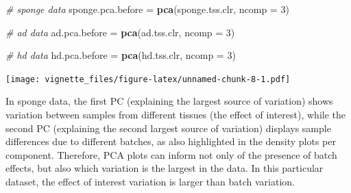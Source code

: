 \documentclass[]{book}
\newenvironment{Shaded}{\begin{snugshade}}{\end{snugshade}}
\newcommand{\KeywordTok}[1]{\textcolor[rgb]{0.13,0.29,0.53}{\textbf{#1}}}
\newcommand{\DataTypeTok}[1]{\textcolor[rgb]{0.13,0.29,0.53}{#1}}
\newcommand{\DecValTok}[1]{\textcolor[rgb]{0.00,0.00,0.81}{#1}}
\newcommand{\FloatTok}[1]{\textcolor[rgb]{0.00,0.00,0.81}{#1}}
\newcommand{\StringTok}[1]{\textcolor[rgb]{0.31,0.60,0.02}{#1}}
\newcommand{\CommentTok}[1]{\textcolor[rgb]{0.56,0.35,0.01}{\textit{#1}}}
\newcommand{\OperatorTok}[1]{\textcolor[rgb]{0.81,0.36,0.00}{\textbf{#1}}}
\newcommand{\NormalTok}[1]{#1}
\begin{document}
\begin{Shaded}
\begin{Highlighting}[]
\CommentTok{# sponge data}
\NormalTok{sponge.pca.before =}\StringTok{ }\KeywordTok{pca}\NormalTok{(sponge.tss.clr, }\DataTypeTok{ncomp =} \DecValTok{3}\NormalTok{)}

\CommentTok{# ad data}
\NormalTok{ad.pca.before =}\StringTok{ }\KeywordTok{pca}\NormalTok{(ad.tss.clr, }\DataTypeTok{ncomp =} \DecValTok{3}\NormalTok{)}

\CommentTok{# hd data}
\NormalTok{hd.pca.before =}\StringTok{ }\KeywordTok{pca}\NormalTok{(hd.tss.clr, }\DataTypeTok{ncomp =} \DecValTok{3}\NormalTok{)}
\end{Highlighting}
\end{Shaded}

\begin{Shaded}
\end{Shaded}

\texttt{[image: vignette\_files/figure-latex/unnamed-chunk-8-1.pdf]}

In sponge data, the first PC (explaining the largest source of
variation) shows variation between samples from different tissues (the
effect of interest), while the second PC (explaining the second largest
source of variation) displays sample differences due to different
batches, as also highlighted in the density plots per component.
Therefore, PCA plots can inform not only of the presence of batch
effects, but also which variation is the largest in the data. In this
particular dataset, the effect of interest variation is larger than
batch variation.
\end{document}
